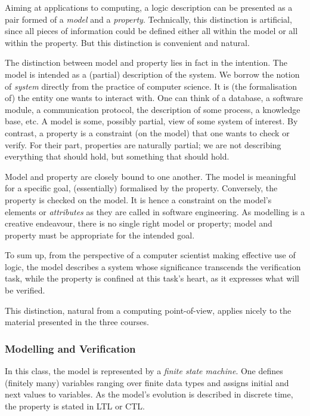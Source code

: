 \documentclass[a4paper,UKenglish]{lipics}
\begin{document}
Aiming at applications to computing, a logic description can be presented as a pair formed of a \emph{model} and a \emph{property}. Technically, this distinction is artificial, since all pieces of information could be defined either all within the model or all within the property. But this distinction is convenient and natural.

The distinction between model and property lies in fact in the intention. The model is intended as a (partial) description of the system. We borrow the notion of \emph{system} directly from the practice of computer science. It is (the formalisation of) the entity one wants to interact with. One can think of a database, a software module, a communication protocol, the description of some process, a knowledge base, etc. A model is some, possibly partial, view of some system of interest. By contrast, a property is a constraint (on the model) that one wants to check or verify. For their part, properties are naturally partial; we are not describing everything that should hold, but something that should hold.

Model and property are closely bound to one another. The model is meaningful for a specific goal, (essentially) formalised by the property. Conversely, the property is checked on the model. It is hence a constraint on the model's elements or \emph{attributes} as they are called in software engineering. As modelling is a creative endeavour, there is no single right model or property; model and property must be appropriate for the intended goal.

To sum up, from the perspective of a computer scientist making effective use of logic, the model describes a system whose significance transcends the verification task, while the property is confined at this task's heart, as it expresses what will be verified.

This distinction, natural from a computing point-of-view, applies nicely to the material presented in the three courses.

\subsubsection{Modelling and Verification}
In this class, the model is represented by a \emph{finite state machine}. One defines (finitely many) variables ranging over finite data types and assigns initial and next values to variables. As the model's evolution is described in discrete time, the property is stated in LTL or CTL.
\end{document}
